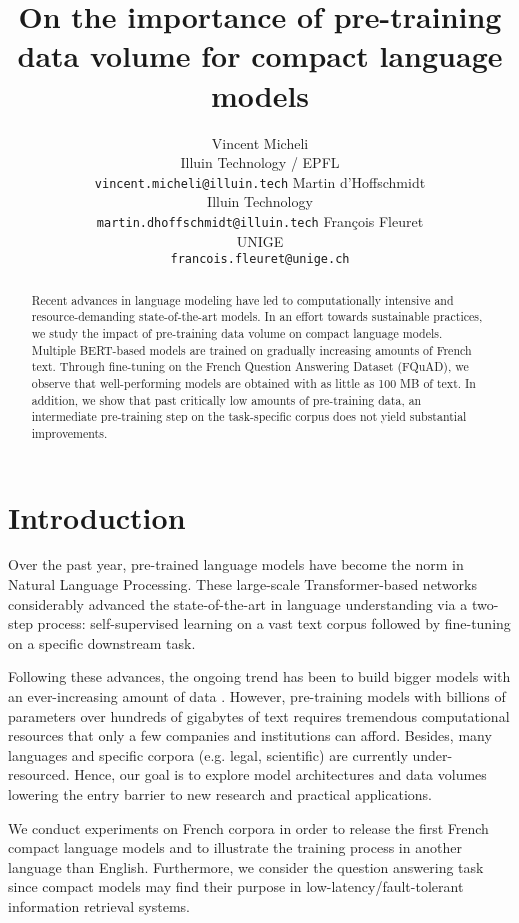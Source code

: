 \documentclass[11pt,a4paper]{article}
\title{On the importance of pre-training data volume for compact language models}
\author{Vincent Micheli \\
  Illuin Technology / EPFL \\
  \texttt{vincent.micheli@illuin.tech}
  \And
  Martin d'Hoffschmidt \\
  Illuin Technology \\
  \texttt{martin.dhoffschmidt@illuin.tech}
  \AND
  François Fleuret \\
  UNIGE \\
  \texttt{francois.fleuret@unige.ch}
  }
\date{}
\begin{document}
\maketitle
\begin{abstract}
Recent advances in language modeling have led to computationally intensive and resource-demanding state-of-the-art models. In an effort towards sustainable practices, we study the impact of pre-training data volume on compact language models. Multiple BERT-based models are trained on gradually increasing amounts of French text. Through fine-tuning on the French Question Answering Dataset (FQuAD), we observe that well-performing models are obtained with as little as 100 MB of text. In addition, we show that past critically low amounts of pre-training data, an intermediate pre-training step on the task-specific corpus does not yield substantial improvements.
\end{abstract}

\section{Introduction}

Over the past year, pre-trained language models have become the norm in Natural Language Processing. These large-scale Transformer-based \citep{attention} networks considerably advanced the state-of-the-art in language understanding \citep{bert} via a two-step process: self-supervised learning on a vast text corpus followed by fine-tuning on a specific downstream task. 

Following these advances, the ongoing trend has been to build bigger models with an ever-increasing amount of data \citep{roberta, t5, gpt2, gpt3}. However, pre-training models with billions of parameters over hundreds of gigabytes of text requires tremendous computational resources that only a few companies and institutions can afford. Besides, many languages and specific corpora (e.g. legal, scientific) are currently under-resourced. Hence, our goal is to explore model architectures and data volumes lowering the entry barrier to new research and practical applications. 

We conduct experiments on French corpora in order to release the first French compact language models and to illustrate the training process in another language than English. Furthermore, we consider the question answering task since compact models may find their purpose in low-latency/fault-tolerant information retrieval systems.
\end{document}
